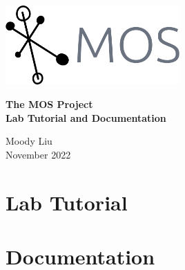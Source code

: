 \documentclass{report}
\begin{document}
\begin{titlepage}
    \vspace*{5cm}
    \begin{center}
        \includegraphics[width=0.5\textwidth]{logo/logo-no-background.png}
    \end{center}

    \vspace{1cm}

    \begin{center}
        \textbf{\huge The MOS Project}\\
        \vspace{0.5cm}
        \textbf{\large Lab Tutorial and Documentation}

        \vspace{5cm}
        Moody Liu\\
        November 2022
    \end{center}
\end{titlepage}

\tableofcontents

\part{Lab Tutorial}




\part{Documentation}
\end{document}
